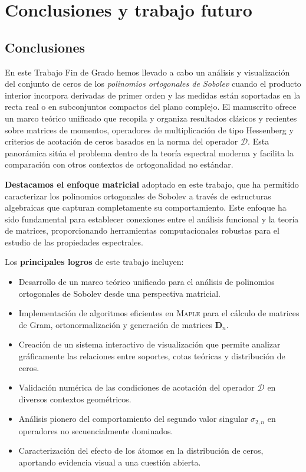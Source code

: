 \chapter{Conclusiones y trabajo futuro}
\label{sec:conclusiones}
\section{Conclusiones}

En este Trabajo Fin de Grado hemos llevado a cabo un análisis y visualización del conjunto de ceros de los \emph{polinomios ortogonales de Sobolev} cuando el producto interior incorpora derivadas de primer orden y las medidas están soportadas en la recta real o en subconjuntos compactos del plano complejo. El manuscrito ofrece un marco teórico unificado que recopila y organiza resultados clásicos y recientes sobre matrices de momentos, operadores de multiplicación de tipo Hessenberg y criterios de acotación de ceros basados en la norma del operador \(\mathcal{D}\). Esta panorámica sitúa el problema dentro de la teoría espectral moderna y facilita la comparación con otros contextos de ortogonalidad no estándar.

\textbf{Destacamos el enfoque matricial} adoptado en este trabajo, que ha permitido caracterizar los polinomios ortogonales de Sobolev a través de estructuras algebraicas que capturan completamente su comportamiento. Este enfoque ha sido fundamental para establecer conexiones entre el análisis funcional y la teoría de matrices, proporcionando herramientas computacionales robustas para el estudio de las propiedades espectrales.

Los \textbf{principales logros} de este trabajo incluyen:
\begin{itemize}
  \item Desarrollo de un marco teórico unificado para el análisis de polinomios ortogonales de Sobolev desde una perspectiva matricial.
  \item Implementación de algoritmos eficientes en \textsc{Maple} para el cálculo de matrices de Gram, ortonormalización y generación de matrices \(\mathbf{D}_n\).
  \item Creación de un sistema interactivo de visualización que permite analizar gráficamente las relaciones entre soportes, cotas teóricas y distribución de ceros.
  \item Validación numérica de las condiciones de acotación del operador \(\mathcal{D}\) en diversos contextos geométricos.
  \item Análisis pionero del comportamiento del segundo valor singular \(\sigma_{2,n}\) en operadores no secuencialmente dominados.
  \item Caracterización del efecto de los átomos en la distribución de ceros, aportando evidencia visual a una cuestión abierta.
\end{itemize}

